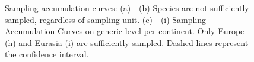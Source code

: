 \begin{center}
\begin{figure}[H]
		\caption[Additional sampling accumulation curves]{Sampling accumulation curves: (a) - (b) Species are not sufficiently sampled, regardless of sampling unit. (c) - (i) Sampling Accumulation Curves on generic level per continent. Only Europe (h) and Eurasia (i) are sufficiently sampled. Dashed lines represent the confidence interval.}
		\label{fig:SACall}
	\end{figure}
\end{center}

\FloatBarrier


